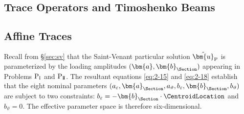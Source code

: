 

\subsection{Trace Operators and Timoshenko Beams}%
% 

\subsection{Affine Traces}

Recall from \S\ref{sec:sv} that the Saint-Venant particular solution 
$\hat{\bm{u}}_{\rm P}$ is parameterized by the loading amplitudes 
$(\bm{a}, \bm{b}_\Section)$ appearing in Problems $\mathrm{P}_{\rm I}$ and 
$\mathrm{P}_{\rm I\!I}$. 
The resultant equations \eqref{eq:2-15} and 
\eqref{eq:2-18} establish that the eight nominal parameters 
$(a_\varepsilon, \bm{a}_\Section, a_\vartheta, b_\varepsilon, \bm{b}_\Section, b_\vartheta)$ 
are subject to two constraints: $b_\varepsilon = -\bm{b}_\Section \cdot \CentroidLocation$ 
and $b_\vartheta = 0$. 
The effective parameter space is therefore six-dimensional.

